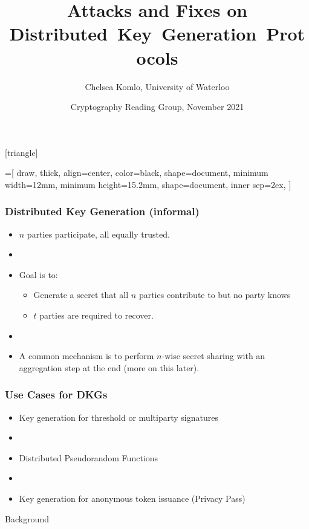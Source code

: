 \documentclass[hyperref={pdfpagelabels=true},table,dvipsnames,14pt,aspectratio=169]{beamer}
\title{Attacks and Fixes on Distributed~Key~Generation~Protocols}
\author{Chelsea Komlo, University of Waterloo}
\date[November 2021]{ Cryptography Reading Group, November 2021}
\begin{document}
[triangle]

=[%
draw,
thick,
align=center,
color=black,
shape=document,
minimum width=12mm,
minimum height=15.2mm,
shape=document,
inner sep=2ex,
]

\begin{frame}
        \thispagestyle{empty}
        \maketitle
\end{frame}


\begin{frame}
  \frametitle{Distributed Key Generation (informal)}

  \begin{itemize}
    \item<1-> $n$ parties participate, all equally trusted.
    \item[]
    \item<2-> Goal is to:
  \begin{itemize}
    \item<3-> Generate a secret that all $n$ parties contribute to but no party knows
    \item<4-> $t$ parties are required to recover.
  \end{itemize}
    \item[]
    \item<5-> A common mechanism is to perform $n$-wise secret sharing with an aggregation step at the end (more on this later).
  \end{itemize}
\end{frame}

\begin{frame}
  \frametitle{Use Cases for DKGs}

  \begin{itemize}
    \item<1-> Key generation for threshold or multiparty signatures
    \item[]
    \item<2-> Distributed Pseudorandom Functions
    \item[]
    \item<3-> Key generation for anonymous token issuance (Privacy Pass)
  \end{itemize}
\end{frame}

\begin{frame}
  \huge
  \centering
  Background
\end{frame}
\end{document}
